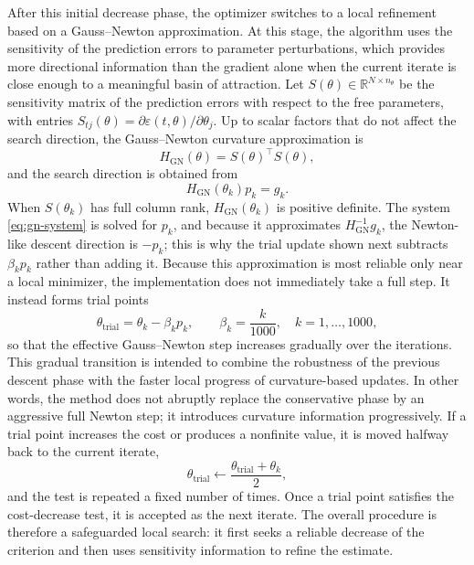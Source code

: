 \documentclass{ifacconf}
\begin{document}
After this initial decrease phase, the optimizer switches to a local refinement
based on a Gauss--Newton approximation.  At this stage, the algorithm uses the
sensitivity of the prediction errors to parameter perturbations, which provides
more directional information than the gradient alone when the current iterate is
close enough to a meaningful basin of attraction.  Let
\(S(\theta)\in\mathbb{R}^{N\times n_\theta}\) be the sensitivity matrix of the
prediction errors with respect to the free parameters, with entries
\(S_{tj}(\theta)=\partial\varepsilon(t,\theta)/\partial\theta_j\).  Up to scalar
factors that do not affect the search direction, the Gauss--Newton curvature
approximation is
\begin{equation}
  H_{\mathrm{GN}}(\theta)=S(\theta)^\top S(\theta),
  \label{eq:gn-hessian}
\end{equation}
and the search direction is obtained from
\begin{equation}
  H_{\mathrm{GN}}(\theta_k)p_k = g_k.
  \label{eq:gn-system}
\end{equation}
When \(S(\theta_k)\) has full column rank, \(H_{\mathrm{GN}}(\theta_k)\) is
positive definite.  The system \eqref{eq:gn-system} is solved for \(p_k\), and
because it approximates \(H_{\mathrm{GN}}^{-1}g_k\), the Newton-like descent
direction is \(-p_k\); this is why the trial update shown next subtracts
\(\beta_k p_k\) rather than adding it.  Because this approximation is most
reliable only near a local minimizer, the implementation does not immediately
take a full step.  It instead forms trial points
\begin{equation}
  \theta_{\mathrm{trial}} = \theta_k - \beta_k p_k,
  \qquad \beta_k = \frac{k}{1000},\quad k=1,\ldots,1000,
  \label{eq:incremental-newton}
\end{equation}
so that the effective Gauss--Newton step increases gradually over the
iterations.  This gradual transition is intended to combine the robustness of
the previous descent phase with the faster local progress of curvature-based
updates.  In other words, the method does not abruptly replace the conservative
phase by an aggressive full Newton step; it introduces curvature information
progressively.  If a trial point increases the cost or produces a nonfinite
value, it is moved halfway back to the current iterate,
\begin{equation}
  \theta_{\mathrm{trial}}
  \leftarrow \frac{\theta_{\mathrm{trial}}+\theta_k}{2},
  \label{eq:bisection-backtracking}
\end{equation}
and the test is repeated a fixed number of times.  Once a trial point satisfies
the cost-decrease test, it is accepted as the next iterate.  The overall
procedure is
therefore a safeguarded local search: it first seeks a reliable decrease of the
criterion and then uses sensitivity information to refine the estimate.
\end{document}
